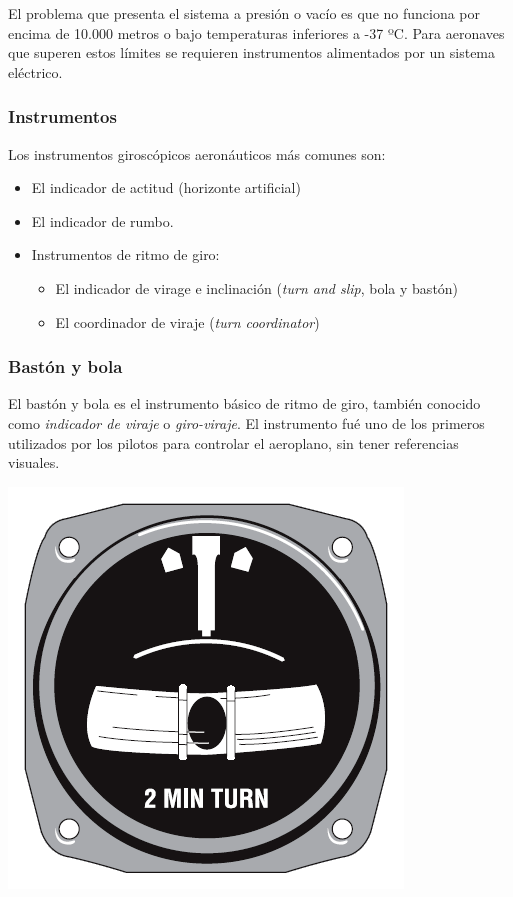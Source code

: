 \documentclass{article}
\begin{document}
El problema que presenta el sistema a presión o vacío es que no funciona por encima de 10.000 metros o bajo temperaturas inferiores a -37 ºC. Para aeronaves que superen estos límites se requieren instrumentos alimentados por un sistema eléctrico.

\subsubsection{Instrumentos}
Los instrumentos giroscópicos aeronáuticos más comunes son:
\begin{itemize}
\item El indicador de actitud (horizonte artificial)
\item El indicador de rumbo.
\item Instrumentos de ritmo de giro:
  \begin{itemize}
    \item El indicador de virage e inclinación (\emph{turn and slip}, bola y bastón)
    \item El coordinador de viraje (\emph{turn coordinator}) 
  \end{itemize}
\end{itemize}

\subsubsection{Bastón y bola}
El bastón y bola es el instrumento básico de ritmo de giro, también conocido como \emph{indicador de viraje} o \emph{giro-viraje}. El instrumento fué uno de los primeros utilizados por los pilotos para controlar el aeroplano, sin tener referencias visuales.

\begin{center}
\includegraphics[scale=0.6]{figuras/Turn_and_slip}
\label{fig:presecion}
\end{center}
\end{document}

